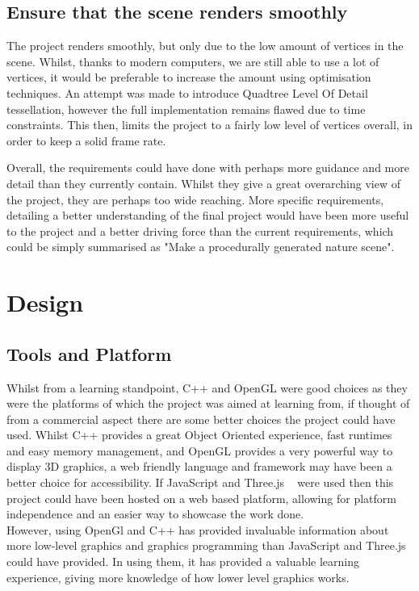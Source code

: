 \documentclass[a4paper,10pt]{report}
\begin{document}
\subsection{Ensure that the scene renders smoothly}
The project renders smoothly, but only due to the low amount of vertices in the scene. Whilst, thanks to modern computers, we are still able to use a lot of vertices, it would be preferable to increase the amount using optimisation techniques. An attempt was made to introduce Quadtree Level Of Detail tessellation, however the full implementation remains flawed due to time constraints. This then, limits the project to a fairly low level of vertices overall, in order to keep a solid frame rate.  

Overall, the requirements could have done with perhaps more guidance and more detail than they currently contain. Whilst they give a great overarching view of the project, they are perhaps too wide reaching. More specific requirements, detailing a better understanding of the final project would have been more useful to the project and a better driving force than the current requirements, which could be simply summarised as "Make a procedurally generated nature scene".

\section{Design}

\subsection{Tools and Platform}
Whilst from a learning standpoint, C++ and OpenGL were good choices as they were the platforms of which the project was aimed at learning from, if thought of from a commercial aspect there are some better choices the project could have used. Whilst C++ provides a great Object Oriented experience, fast runtimes and easy memory management, and OpenGL provides a very powerful way to display 3D graphics, a web friendly language and framework may have been a better choice for accessibility. If JavaScript and Three.js ~\cite{cabello2010three} were used then this project could have been hosted on a web based platform, allowing for platform independence and an easier way to showcase the work done. \\

However, using OpenGl and C++ has provided invaluable information about more low-level graphics and graphics programming than JavaScript and Three.js could have provided. In using them, it has provided a valuable learning experience, giving more knowledge of how lower level graphics works. 
\end{document}
